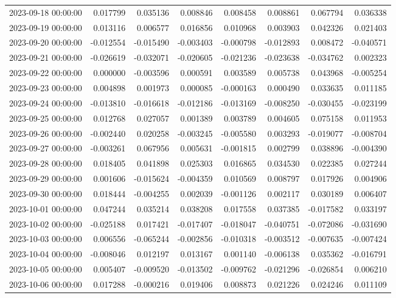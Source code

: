 \begin{tabular}{lrrrrrrr}
2023-09-18 00:00:00 & 0.017799 & 0.035136 & 0.008846 & 0.008458 & 0.008861 & 0.067794 & 0.036338 \\
2023-09-19 00:00:00 & 0.013116 & 0.006577 & 0.016856 & 0.010968 & 0.003903 & 0.042326 & 0.021403 \\
2023-09-20 00:00:00 & -0.012554 & -0.015490 & -0.003403 & -0.000798 & -0.012893 & 0.008472 & -0.040571 \\
2023-09-21 00:00:00 & -0.026619 & -0.032071 & -0.020605 & -0.021236 & -0.023638 & -0.034762 & 0.002323 \\
2023-09-22 00:00:00 & 0.000000 & -0.003596 & 0.000591 & 0.003589 & 0.005738 & 0.043968 & -0.005254 \\
2023-09-23 00:00:00 & 0.004898 & 0.001973 & 0.000085 & -0.000163 & 0.000490 & 0.033635 & 0.011185 \\
2023-09-24 00:00:00 & -0.013810 & -0.016618 & -0.012186 & -0.013169 & -0.008250 & -0.030455 & -0.023199 \\
2023-09-25 00:00:00 & 0.012768 & 0.027057 & 0.001389 & 0.003789 & 0.004605 & 0.075158 & 0.011953 \\
2023-09-26 00:00:00 & -0.002440 & 0.020258 & -0.003245 & -0.005580 & 0.003293 & -0.019077 & -0.008704 \\
2023-09-27 00:00:00 & -0.003261 & 0.067956 & 0.005631 & -0.001815 & 0.002799 & 0.038896 & -0.004390 \\
2023-09-28 00:00:00 & 0.018405 & 0.041898 & 0.025303 & 0.016865 & 0.034530 & 0.022385 & 0.027244 \\
2023-09-29 00:00:00 & 0.001606 & -0.015624 & -0.004359 & 0.010569 & 0.008797 & 0.017926 & 0.004906 \\
2023-09-30 00:00:00 & 0.018444 & -0.004255 & 0.002039 & -0.001126 & 0.002117 & 0.030189 & 0.006407 \\
2023-10-01 00:00:00 & 0.047244 & 0.035214 & 0.038208 & 0.017558 & 0.037385 & -0.017582 & 0.033197 \\
2023-10-02 00:00:00 & -0.025188 & 0.017421 & -0.017407 & -0.018047 & -0.040751 & -0.072086 & -0.031690 \\
2023-10-03 00:00:00 & 0.006556 & -0.065244 & -0.002856 & -0.010318 & -0.003512 & -0.007635 & -0.007424 \\
2023-10-04 00:00:00 & -0.008046 & 0.012197 & 0.013167 & 0.001140 & -0.006138 & 0.035362 & -0.016791 \\
2023-10-05 00:00:00 & 0.005407 & -0.009520 & -0.013502 & -0.009762 & -0.021296 & -0.026854 & 0.006210 \\
2023-10-06 00:00:00 & 0.017288 & -0.000216 & 0.019406 & 0.008873 & 0.021226 & 0.024246 & 0.011109 \\

\end{tabular}
